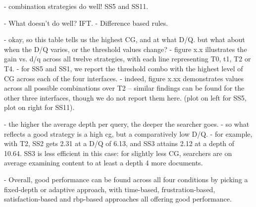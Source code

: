     - combination strategies do well! SS5 and SS11.
    
    - What doesn't do well? IFT.
    - Difference based rules.
    
    - okay, so this table tells us the highest CG, and at what D/Q. but what about when the D/Q varies, or the threshold values change?
         - figure x.x illustrates the gain vs. d/q across all twelve strategies, with each line representing T0, t1, T2 or T4.
         - for SS5 and SS1, we report the threshold combo with the highest level of CG across each of the four interfaces.
         - indeed, figure x.xx demonstrates values across all possible combinations over T2 -- similar findings can be found for the other three interfaces, though we do not report them here. (plot on left for SS5, plot on right for SS11).
    
    - the higher the average depth per query, the deeper the searcher goes.
    - so what reflects a good strategy is a high cg, but a comparatively low D/Q.
    - for example, with T2, SS2 gets 2.31 at a D/Q of 6.13, and SS3 attains 2.12 at a depth of 10.64. SS3 is less efficient in this case: for slightly less CG, searchers are on average examining content to at least a depth 4 more documents.
    
    - Overall, good performance can be found across all four conditions by picking a fixed-depth or adaptive approach, with time-based, frustration-based, satisfaction-based and rbp-based approaches all offering good performance.


